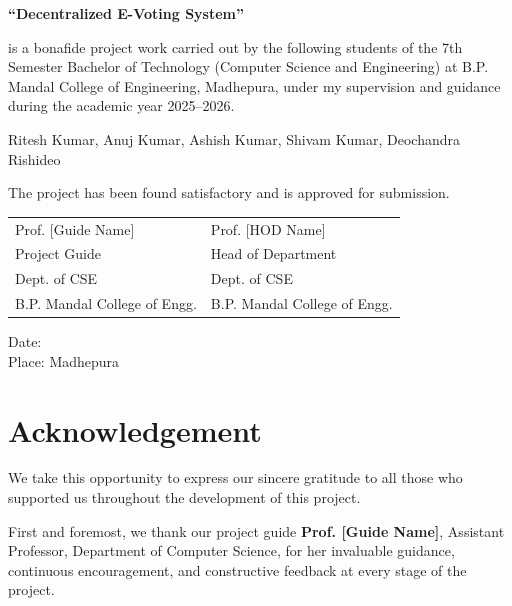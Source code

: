 \documentclass[12pt,a4paper]{report}
\begin{document}
\begin{center}
\textbf{``Decentralized E-Voting System''}
\end{center}

is a bonafide project work carried out by the following students of the
7th Semester Bachelor of Technology (Computer Science and Engineering)
at B.P. Mandal College of Engineering, Madhepura, under my supervision
and guidance during the academic year 2025--2026.

\vspace{0.3cm}

\begin{center}
Ritesh Kumar, Anuj Kumar, Ashish Kumar, Shivam Kumar, Deochandra Rishideo
\end{center}

The project has been found satisfactory and is approved for submission.

\vspace{3cm}

\noindent
\begin{tabular}{p{6cm} p{6cm}}
Prof. [Guide Name]         & Prof. [HOD Name]\\
Project Guide              & Head of Department\\
Dept. of CSE               & Dept. of CSE\\
B.P. Mandal College of Engg. & B.P. Mandal College of Engg.\\
\end{tabular}

\vspace{2cm}

\noindent
Date: \underline{\hspace{4cm}} \\[0.4cm]
Place: Madhepura

\newpage

\chapter*{Acknowledgement}

We take this opportunity to express our sincere gratitude to all those who
supported us throughout the development of this project.

First and foremost, we thank our project guide \textbf{Prof. [Guide Name]},
Assistant Professor, Department of Computer Science, for her invaluable guidance,
continuous encouragement, and constructive feedback at every stage of the project.
\end{document}
